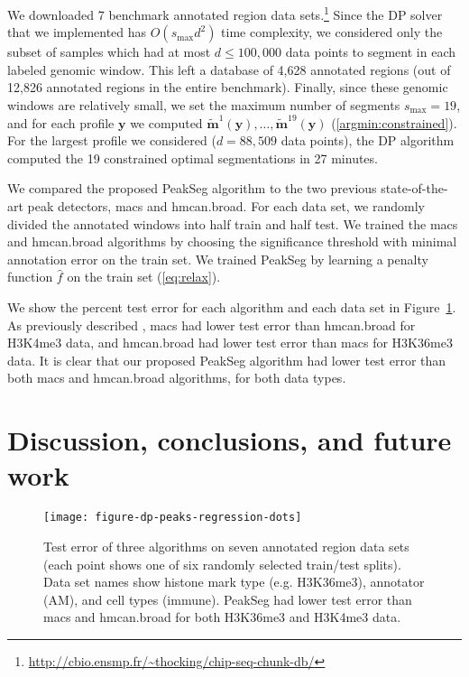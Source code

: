 \documentclass{article}
\begin{document}
We downloaded 7 benchmark annotated region data
sets.\footnote{\url{http://cbio.ensmp.fr/~thocking/chip-seq-chunk-db/}}
Since the DP solver that we implemented has $O(s_{\text{max}} d^2)$
time complexity, we considered only the subset of samples which had at
most $d\leq 100,000$ data points to segment in each labeled genomic
window. This left a database of 4,628 annotated regions
(out of 12,826 annotated regions in the entire benchmark). Finally,
since these genomic windows are relatively small, we set the maximum
number of segments $s_{\text{max}}=19$, and for each profile $\mathbf
y$ we computed $\mathbf{\tilde m}^1(\mathbf y), \dots, \mathbf{\tilde
  m}^{19}(\mathbf y)$ (\ref{argmin:constrained}). For the largest
profile we considered ($d=88,509$ data points), the DP algorithm
computed the 19 constrained optimal segmentations in 27 minutes.

We compared the proposed PeakSeg algorithm to the two previous
state-of-the-art peak detectors, macs and \mbox{hmcan.broad}. For each
data set, we randomly divided the annotated windows into half train
and half test. We trained the macs and hmcan.broad algorithms by
choosing the significance threshold with minimal annotation error on
the train set. We trained PeakSeg by learning a penalty function $\hat f$
on the train set (\ref{eq:relax}).

We show the percent test error for each algorithm and each data set in
Figure~\ref{fig:test-error}. As previously described
\citep{hocking2014visual}, macs had lower test error than
\mbox{hmcan.broad} for H3K4me3 data, and \mbox{hmcan.broad} had lower
test error than macs for H3K36me3 data. It is clear that our proposed
PeakSeg algorithm had lower test error than both macs and hmcan.broad
algorithms, for both data types.

%   

\section{Discussion, conclusions, and future work}

\begin{figure}[t!]
  \centering
  \texttt{[image: figure-dp-peaks-regression-dots]}
  \vskip -0.5cm
  \caption{Test error of three algorithms on seven annotated region
    data sets (each point shows one of six randomly selected
    train/test splits). Data set names show histone mark type
    (e.g. H3K36me3), annotator (AM), and cell types (immune). PeakSeg
    had lower test error than macs and \mbox{hmcan.broad} for both
    H3K36me3 and H3K4me3 data.}
  \label{fig:test-error}
\end{figure}
\end{document}
